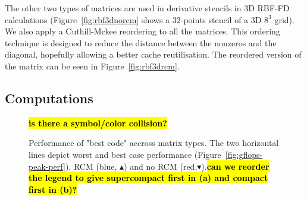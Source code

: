 \documentclass[10pt,conference,compsocconf]{IEEEtran}
\newcommand{\todo}[1]{{\color{red}\textbf{\hl{#1}}\xspace}}
\begin{document}
The other two types of matrices are used in derivative stencils in 3D
RBF-FD calculations (Figure~\ref{fig:rbf3dnorcm} shows a $32$-points
stencil of a 3D $8^3$ grid). We also apply a Cuthill-Mckee reordering to
all the matrices.  This ordering technique is designed to reduce the
distance between the nonzeros and the diagonal, hopefully allowing a
better cache reutilisation. The reordered version of the matrix can be
seen in Figure~\ref{fig:rbf3drcm}.


\subsection{Computations}

\begin{figure}[t]
  \centering
  
  \caption{Performance of "best code" accross matrix types. The two
    horizontal lines depict worst and best case performance
    (Figure~\ref{fig:gflops-peak-perf}). RCM (blue, $\blacktriangle$)
    and no RCM (red,$\blacktriangledown$).\todo{can we reorder the
      legend to give supercompact first in (a) and compact first in
      (b)?}}\todo{is there a symbol/color collision?}
  \label{fig:expe_types}
\end{figure}
\end{document}
